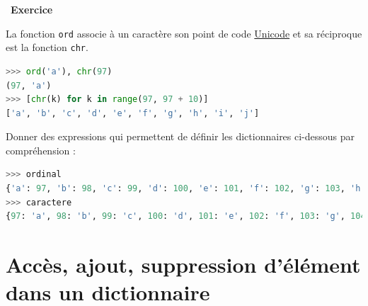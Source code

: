 \documentclass[
  11pt,
]{article}
\newcommand{\passthrough}[1]{#1}
\newcounter{exo}
\newenvironment{exercice}[1]
{\par \medskip   \addtocounter{exo}{1} \noindent  
\begin{bclogo}[arrondi =0.1,   noborder = true, logo=\bccrayon, marge=4]{~\textbf{Exercice} \textbf{\theexo} {\itshape #1} }  \par}
{
\end{bclogo}
 \par \bigskip }
\begin{document}
\begin{exercice}{}

La fonction \passthrough{\lstinline!ord!} associe à un caractère son
point de code \href{https://fr.wikipedia.org/wiki/Unicode}{Unicode} et
sa réciproque est la fonction \passthrough{\lstinline!chr!}.

\begin{lstlisting}[language=Python]
>>> ord('a'), chr(97)
(97, 'a')
>>> [chr(k) for k in range(97, 97 + 10)]
['a', 'b', 'c', 'd', 'e', 'f', 'g', 'h', 'i', 'j']
\end{lstlisting}

Donner des expressions qui permettent de définir les dictionnaires
ci-dessous par compréhension :

\begin{lstlisting}[language=Python]
>>> ordinal
{'a': 97, 'b': 98, 'c': 99, 'd': 100, 'e': 101, 'f': 102, 'g': 103, 'h': 104, 'i': 105, 'j': 106}
>>> caractere
{97: 'a', 98: 'b', 99: 'c', 100: 'd', 101: 'e', 102: 'f', 103: 'g', 104: 'h', 105: 'i', 106: 'j'}
\end{lstlisting}

\end{exercice}

\hypertarget{accuxe8s-ajout-suppression-duxe9luxe9ment-dans-un-dictionnaire}{%
\section{Accès, ajout, suppression d'élément dans un
dictionnaire}\label{accuxe8s-ajout-suppression-duxe9luxe9ment-dans-un-dictionnaire}}
\end{document}
